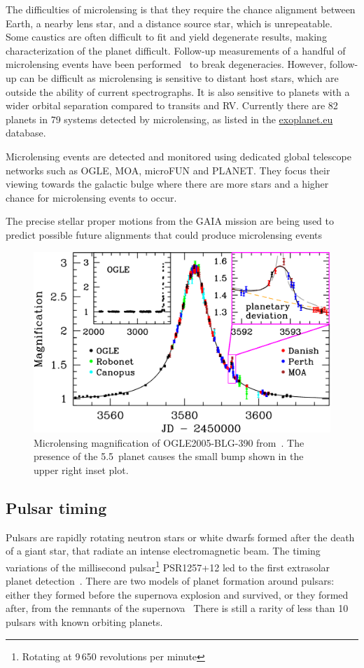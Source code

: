 The difficulties of microlensing is that they require the chance alignment between Earth, a nearby lens star, and a distance source star, which is unrepeatable.
Some caustics are often difficult to fit and yield degenerate results, making characterization of the planet difficult.
Follow-up measurements of a handful of microlensing events have been performed~\citep[e.g.][]{kubas_frozen_2012, batista_confirmation_2015, santerne_spectroscopic_2016} to break degeneracies.
However, follow-up can be difficult as microlensing is sensitive to distant host stars, which are outside the ability of current spectrographs.
It is also sensitive to planets with a wider orbital separation compared to transits and {RV}.
Currently there are 82 planets in 79 systems detected by microlensing, as listed in the \href{https:\\www.exoplanet.eu}{exoplanet.eu} database.

Microlensing events are detected and monitored using dedicated global telescope networks such as {OGLE}, {MOA}, {microFUN} and {PLANET}.
They focus their viewing towards the galactic bulge where there are more stars and a higher chance for microlensing events to occur.

The precise stellar proper motions from the GAIA mission are being used to predict possible future alignments that could produce microlensing events~\citep{kluter_prediction_2018}

\begin{figure}
    \centering
    \includegraphics[width=0.5\linewidth]{./figures/introduction/Microlensing_OGLE2005-BLG-390.pdf}
    \caption{Microlensing magnification of OGLE2005-BLG-390 from~\citep{beaulieu_discovery_2006}.
    The presence of the 5.5\,\Mjup{} planet causes the small bump shown in the upper right inset plot.}
    \label{fig:microlensing_example}
\end{figure}


\subsection{Pulsar timing}
\label{sub:pulsar_timing}
Pulsars are rapidly rotating neutron stars or white dwarfs formed after the death of a giant star, that radiate an intense electromagnetic beam.
The timing variations of the millisecond pulsar\footnote{Rotating at 9\,650 revolutions per minute} {PSR1257+12} led to the first extrasolar planet detection~\citep{wolszczan_planetary_1992}.
There are two models of planet formation around pulsars: either they formed before the supernova explosion and survived, or they formed after, from the remnants of the supernova~\citep{Starovoit_existence_2017}
There is still a rarity of less than 10 pulsars with known orbiting planets.
